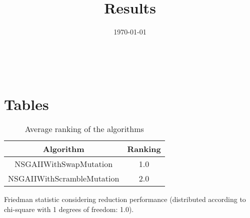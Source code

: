 \documentclass{article}
\title{Results}
\author{}
\date{\today}
\begin{document}
\oddsidemargin 0in \topmargin 0in\maketitle
\
\section{Tables}
\begin{table}[!htp]
\centering
\caption{Average ranking of the algorithms}
\begin{tabular}{c|c}
Algorithm&Ranking\\
\hline
NSGAIIWithSwapMutation&1.0\\
NSGAIIWithScrambleMutation&2.0\\
\end{tabular}
\end{table}


Friedman statistic considering reduction performance (distributed according to chi-square with 1 degrees of freedom: 1.0).
\end{document}

